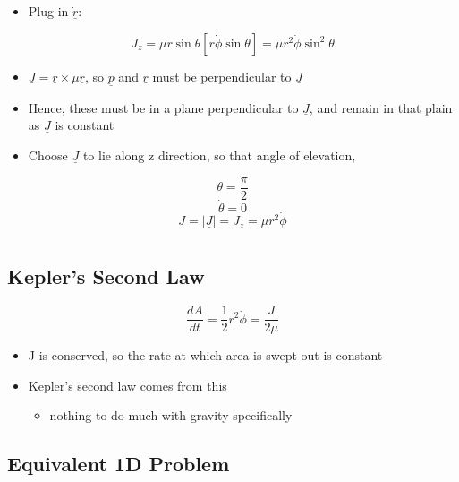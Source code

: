 \documentclass[a4paper,11pt,normalem]{article}
\begin{document}
\begin{itemize}
\item
  Plug in \(\underline{\dot{r}}\):
\end{itemize}

\[
    J_z = \mu r\sin\theta [r\dot{\phi}\sin\theta] = \mu r^2 \dot{\phi} \sin^2\theta
\]

\begin{itemize}
\item
  \(\underline{J} = \underline{r} \times \mu\underline{\dot{r}}\), so
  \(\underline{p}\) and \(\underline{r}\) must be perpendicular to
  \(\underline{J}\)
\item
  Hence, these must be in a plane perpendicular to \(\underline{J}\),
  and remain in that plain as \(\underline{J}\) is constant
\item
  Choose \(\underline{J}\) to lie along z direction, so that angle of
  elevation,
\end{itemize}

\[
    \theta = \frac{\pi}{2} \] \[
    \dot{\theta} = 0 \] \[
    J = |\underline{J}| = J_z = \mu r^2 \dot{\phi}
\]

\section{}\label{lecture-9}

\subsection{Kepler's Second Law}\label{keplers-second-law}

\[
    \frac{dA}{dt} = \frac{1}{2}r^2 \dot{\phi} = \frac{J}{2\mu}
\]

\begin{itemize}
\item
  J is conserved, so the rate at which area is swept out is constant
\item
  Kepler's second law comes from this
  \begin{itemize}
  \item
    nothing to do much with gravity specifically
  \end{itemize}
\end{itemize}

\subsection{Equivalent 1D Problem}\label{equivalent-1d-problem}
\end{document}
